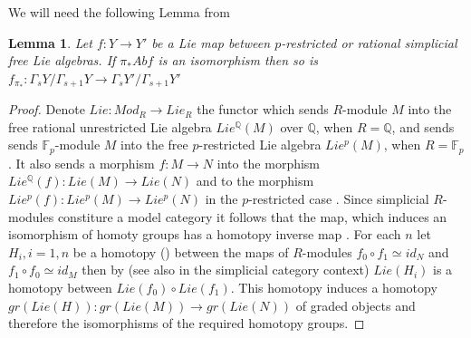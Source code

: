 \documentclass[11pt,a4paper]{article}
\newtheorem{lemma}[theorem]{Lemma}
\begin{document}
We will need the following Lemma from \cite[4.4]{BOUSFIELD}
\begin{lemma}\label{nl1}
Let $f:Y\rightarrow Y'$ be a Lie map between  $p$-restricted or rational simplicial free Lie algebras. If $\pi_* Ab f$ is an isomorphism then so is $f_{\pi_*}:\Gamma_s Y/\Gamma_{s+1} Y\rightarrow \Gamma_s Y'/\Gamma_{s+1} Y'$
\end{lemma}
\begin{proof} Denote $Lie: Mod_R\rightarrow Lie_R$ the functor which sends $R$-module $M$ into the free rational unrestricted Lie algebra $Lie^{\mathbb{Q}}(M)$ over $\mathbb{Q}$, when $R=\mathbb{Q}$, and sends sends $\mathbb{F}_p$-module $M$ into the free $p$-restricted Lie algebra $Lie^p(M)$, when $R=\mathbb{F}_p$. 
It also sends a morphism $f: M\rightarrow N$ into the morphism $Lie^{\mathbb{Q}}(f):Lie(M)\rightarrow Lie(N)$ \cite[Ch.II, 5]{Bou} and  to the morphism $Lie^p(f):Lie^p(M)\rightarrow Lie^p(N)$ in the $p$-restricted case \cite[Exercise 4, Ch.II, 4]{Bou}. 
Since simplicial $R$-modules constiture a model category it follows that the map, which induces an isomorphism of homoty groups has a homotopy inverse map \cite[]{Qui1}.
For each $n$ let $H_i, i=1,n$ be a homotopy (\cite[Ch. III, Lemma 2.15.]{GJ}) between the maps of $R$-modules $f_0\circ f_1\simeq id_N$ and $f_1\circ f_0\simeq id_M$ then by \cite[Satz 1.15]{DP} (see also \cite[Ch.II, 1.7-1.8, Ch II, \S 6]{Qui1} in the simplicial category context) $Lie(H_i)$ is a homotopy between $Lie(f_0)\circ Lie(f_1)$.
This homotopy induces a homotopy $gr(Lie(H)): gr(Lie(M))\rightarrow gr(Lie(N))$ of graded objects and therefore the isomorphisms of the required homotopy groups.
\end{proof}
\end{document}
